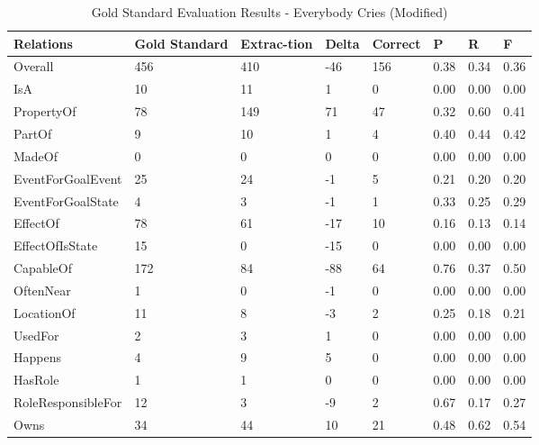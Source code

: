 \begin{table}[H]   %
\centering
\caption{Gold Standard Evaluation Results - Everybody Cries (Modified)} \vspace{0.25em}
\begin{tabular}{|p{3.5cm}|p{2cm}|p{1.5cm}|p{1cm}|p{1.5cm}|p{1cm}|p{1cm}|p{1cm}|} \hline
\textbf{Relations} & \textbf{Gold Standard} & \textbf{Extrac-tion} & \textbf{Delta} & \textbf{Correct} & \textbf{P} & \textbf{R} & \textbf{F} \\ \hline
Overall & 456 & 410 & -46 & 156 & 0.38 & 0.34 & 0.36 \\ \hline
IsA & 10 & 11 & 1 & 0 & 0.00 & 0.00 & 0.00 \\ \hline
PropertyOf & 78 & 149 & 71 & 47 & 0.32 & 0.60 & 0.41 \\ \hline
PartOf  & 9 & 10 & 1 & 4 & 0.40 & 0.44 & 0.42 \\ \hline
MadeOf & 0 & 0 & 0 & 0 & 0.00 & 0.00 & 0.00 \\ \hline
EventForGoalEvent & 25 & 24 & -1 & 5 & 0.21 & 0.20 & 0.20 \\ \hline
EventForGoalState & 4 & 3 & -1 & 1 & 0.33 & 0.25 & 0.29 \\ \hline
EffectOf & 78 & 61 & -17 & 10 & 0.16 & 0.13 & 0.14 \\ \hline
EffectOfIsState & 15 & 0 & -15 & 0 & 0.00 & 0.00 & 0.00 \\ \hline
CapableOf & 172 & 84 & -88 & 64 & 0.76 & 0.37 & 0.50 \\ \hline
OftenNear & 1 & 0 & -1 & 0 & 0.00 & 0.00 & 0.00 \\ \hline
LocationOf & 11 & 8 & -3 & 2 & 0.25 & 0.18 & 0.21 \\ \hline
UsedFor & 2 & 3 & 1 & 0 & 0.00 & 0.00 & 0.00 \\ \hline
Happens & 4 & 9 & 5 & 0 & 0.00 & 0.00 & 0.00 \\ \hline
HasRole & 1 & 1 & 0 & 0 & 0.00 & 0.00 & 0.00 \\ \hline
RoleResponsibleFor & 12 & 3 & -9 & 2 & 0.67 & 0.17 & 0.27 \\ \hline
Owns & 34 & 44 & 10 & 21 & 0.48 & 0.62 & 0.54 \\ \hline
\end{tabular}
\label{tab:gold2}
\end{table}

